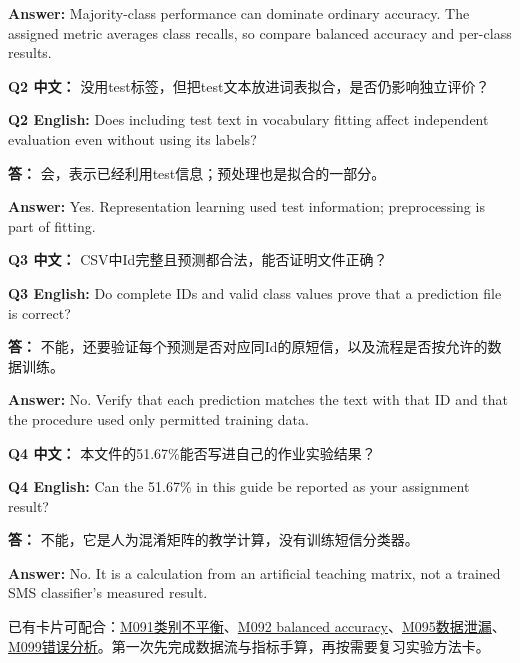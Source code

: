 \textbf{Answer:} Majority-class performance can dominate ordinary accuracy. The assigned metric averages class recalls, so compare balanced accuracy and per-class results.


\textbf{Q2 中文：} 没用test标签，但把test文本放进词表拟合，是否仍影响独立评价？

\textbf{Q2 English:} Does including test text in vocabulary fitting affect independent evaluation even without using its labels?

\textbf{答：} 会，表示已经利用test信息；预处理也是拟合的一部分。

\textbf{Answer:} Yes. Representation learning used test information; preprocessing is part of fitting.


\textbf{Q3 中文：} CSV中Id完整且预测都合法，能否证明文件正确？

\textbf{Q3 English:} Do complete IDs and valid class values prove that a prediction file is correct?

\textbf{答：} 不能，还要验证每个预测是否对应同Id的原短信，以及流程是否按允许的数据训练。

\textbf{Answer:} No. Verify that each prediction matches the text with that ID and that the procedure used only permitted training data.


\textbf{Q4 中文：} 本文件的51.67\%能否写进自己的作业实验结果？

\textbf{Q4 English:} Can the 51.67\% in this guide be reported as your assignment result?

\textbf{答：} 不能，它是人为混淆矩阵的教学计算，没有训练短信分类器。

\textbf{Answer:} No. It is a calculation from an artificial teaching matrix, not a trained SMS classifier's measured result.


已有卡片可配合：\href{https://crazyshout.github.io/micro-course/cards.html\#CS5489-M091}{M091类别不平衡}、\href{https://crazyshout.github.io/micro-course/cards.html\#CS5489-M092}{M092 balanced accuracy}、\href{https://crazyshout.github.io/micro-course/cards.html\#CS5489-M095}{M095数据泄漏}、\href{https://crazyshout.github.io/micro-course/cards.html\#CS5489-M099}{M099错误分析}。第一次先完成数据流与指标手算，再按需要复习实验方法卡。





